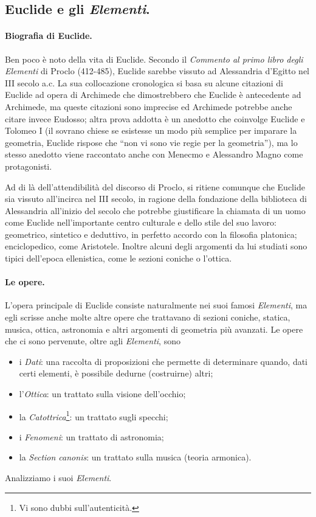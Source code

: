 \subsection{Euclide e gli \textit{Elementi}.}\label{EuclideEGliElementi}
\paragraph{Biografia di Euclide.} Ben poco \`e noto della vita di Euclide. Secondo il \textit{Commento al primo libro degli Elementi} di Proclo (412-485), Euclide sarebbe vissuto ad Alessandria d'Egitto nel III secolo a.c. La sua collocazione cronologica si basa su alcune citazioni di Euclide ad opera di Archimede che dimostrebbero che Euclide \`e antecedente ad Archimede, ma queste citazioni sono imprecise ed Archimede potrebbe anche citare invece Eudosso; altra prova addotta \`e un anedotto che coinvolge Euclide e Tolomeo I (il sovrano chiese se esistesse un modo pi\`u semplice per imparare la geometria, Euclide rispose che ``non vi sono vie regie per la geometria''), ma lo stesso anedotto viene raccontato anche con Menecmo e Alessandro Magno come protagonisti. 
\par Ad di l\`a dell'attendibilit\`a del discorso di Proclo, si ritiene comunque che Euclide sia vissuto all'incirca nel III secolo, in ragione della fondazione della biblioteca di Alessandria all'inizio del secolo che potrebbe giustificare la chiamata di un uomo come Euclide nell'importante centro culturale e dello stile del suo lavoro: geometrico, sintetico e deduttivo, in perfetto accordo con la filosofia platonica; enciclopedico, come Aristotele. Inoltre alcuni degli argomenti da lui studiati sono tipici dell'epoca ellenistica, come le sezioni coniche o l'ottica.
\paragraph{Le opere.} L'opera principale di Euclide consiste naturalmente nei suoi famosi \textit{Elementi}, ma egli scrisse anche molte altre opere che trattavano di sezioni coniche, statica, musica, ottica, astronomia e altri argomenti di geometria pi\`u avanzati. Le opere che ci sono pervenute, oltre agli \textit{Elementi}, sono
\begin{itemize}
	\item i \textit{Dati}: una raccolta di proposizioni che permette di determinare quando, dati certi elementi, \`e possibile dedurne (costruirne) altri;
	\item l'\textit{Ottica}: un trattato sulla visione dell'occhio;
	\item la \textit{Catottrica}\footnote{Vi sono dubbi sull'autenticit\`a.}: un trattato sugli specchi;
	\item i \textit{Fenomeni}: un trattato di astronomia;
	\item la \textit{Section canonis}: un trattato sulla musica (teoria armonica).
\end{itemize}
\par Analizziamo i suoi \textit{Elementi}.
